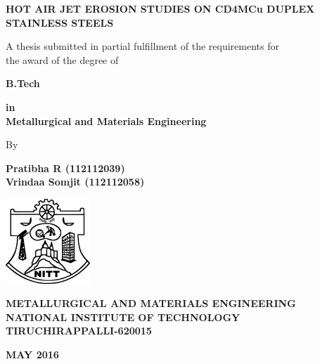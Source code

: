 \begin{titlepage}
\begin{center}
\fontsize{18pt}{1cm}\selectfont \textbf{HOT AIR JET EROSION STUDIES ON CD4MCu DUPLEX STAINLESS STEELS}

\vspace*{1.4cm}
\fontsize{14pt}{21pt}\selectfont A thesis submitted in partial fulfillment of the requirements for\\
the award of the degree of

\vspace*{0.8cm}
\fontsize{14pt}{1cm}\selectfont\textbf{B.Tech} 

\vspace*{0.8cm}
\textbf{in\\Metallurgical and Materials Engineering}

\vspace*{2.0cm}
By

\textbf{Pratibha R (112112039)}\\
\textbf{Vrindaa Somjit (112112058)}

\vspace*{3.4cm}
\includegraphics[width=1.25in]{NITT-Logo}

\vspace*{0.3cm}
\fontsize{16pt}{16pt}\selectfont \textbf{METALLURGICAL AND MATERIALS ENGINEERING\\NATIONAL INSTITUTE OF TECHNOLOGY\\TIRUCHIRAPPALLI-620015}

\vspace*{0.5cm}
\textbf{MAY 2016}
\end{center}
\end{titlepage}
